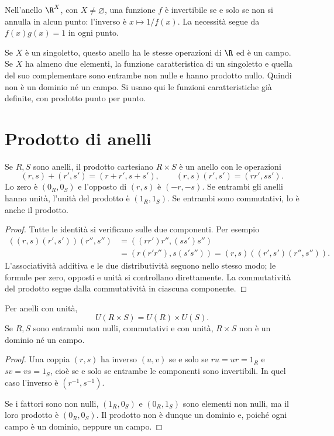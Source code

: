 \begin{esempio}
Nell'anello $\R^X$, con $X\ne\varnothing$, una funzione $f$ è invertibile se e solo se non si annulla in alcun punto: l'inverso è $x\mapsto1/f(x)$. La necessità segue da $f(x)g(x)=1$ in ogni punto.

Se $X$ è un singoletto, questo anello ha le stesse operazioni di $\R$ ed è un campo. Se $X$ ha almeno due elementi, la funzione caratteristica di un singoletto e quella del suo complementare sono entrambe non nulle e hanno prodotto nullo. Quindi non è un dominio né un campo. Si usano qui le funzioni caratteristiche già definite, con prodotto punto per punto.
\end{esempio}

\section{Prodotto di anelli}
\begin{proposizione}
Se $R,S$ sono anelli, il prodotto cartesiano $R\times S$ è un anello con le operazioni
\[
(r,s)+(r',s')=(r+r',s+s'),\qquad
(r,s)(r',s')=(rr',ss').
\]
Lo zero è $(0_R,0_S)$ e l'opposto di $(r,s)$ è $(-r,-s)$. Se entrambi gli anelli hanno unità, l'unità del prodotto è $(1_R,1_S)$. Se entrambi sono commutativi, lo è anche il prodotto.
\end{proposizione}
\begin{proof}
Tutte le identità si verificano sulle due componenti. Per esempio
\[
\begin{aligned}
((r,s)(r',s'))(r'',s'')
 &=((rr')r'',(ss')s'')\\
 &=(r(r'r''),s(s's''))=(r,s)((r',s')(r'',s'')).
\end{aligned}
\]
L'associatività additiva e le due distributività seguono nello stesso modo; le formule per zero, opposti e unità si controllano direttamente. La commutatività del prodotto segue dalla commutatività in ciascuna componente.
\end{proof}

\begin{proposizione}
Per anelli con unità,
\[
U(R\times S)=U(R)\times U(S).
\]
Se $R,S$ sono entrambi non nulli, commutativi e con unità, $R\times S$ non è un dominio né un campo.
\end{proposizione}
\begin{proof}
Una coppia $(r,s)$ ha inverso $(u,v)$ se e solo se $ru=ur=1_R$ e $sv=vs=1_S$, cioè se e solo se entrambe le componenti sono invertibili. In quel caso l'inverso è $(r^{-1},s^{-1})$.

Se i fattori sono non nulli, $(1_R,0_S)$ e $(0_R,1_S)$ sono elementi non nulli, ma il loro prodotto è $(0_R,0_S)$. Il prodotto non è dunque un dominio e, poiché ogni campo è un dominio, neppure un campo.
\end{proof}

